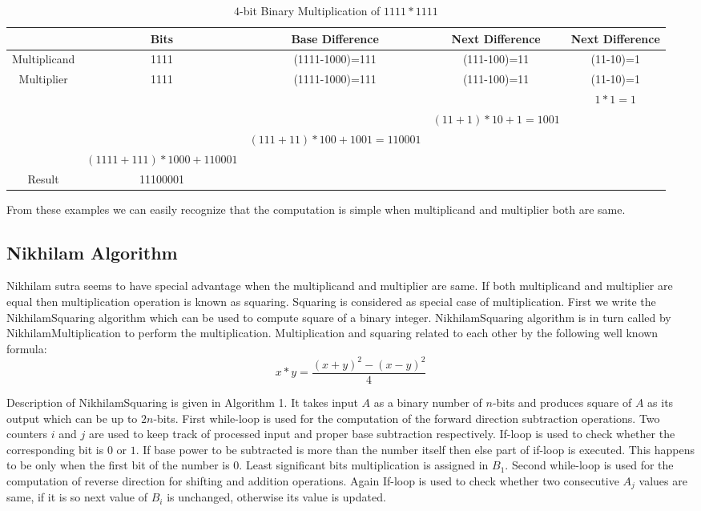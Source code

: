 \documentclass[conference]{IEEEtran}
\begin{document}
\begin{table*}[ht]
\renewcommand{\arraystretch}{1.3}
\caption{$4$-bit Binary Multiplication of $1111*1111$}
\label{table 7}
\begin{center}
\begin{tabular}{|c| c| c| c| c|} 
\hline
 & Bits & Base Difference  & Next Difference & Next Difference  \\ [1ex] \hline\hline 
Multiplicand & 1111 & (1111-1000)=111 &(111-100)=11 & (11-10)=1  \\ \hline
Multiplier & 1111 & (1111-1000)=111 &(111-100)=11 & (11-10)=1  \\ \hline
 &  &  &  & $1*1=1$  \\ \hline
 &  &  & $(11+1)*10+1=1001$ & \\ \hline
 &  & $(111+11)*100 + 1001=110001$ &  & \\ \hline
 & $(1111+111)*1000 + 110001$ &  &  & \\ \hline
Result & 11100001 &  &  &   \\ [1ex] \hline

\end{tabular} 
\end{center}
\end{table*} 


From these examples we can easily recognize that the computation is simple when multiplicand and multiplier both are same. 


\subsection{Nikhilam Algorithm}
 Nikhilam sutra seems to have special advantage when the multiplicand and multiplier are same. If both multiplicand and multiplier are equal then multiplication operation is known as squaring. Squaring is considered as special case of multiplication. First we write the NikhilamSquaring algorithm which can be used to compute square of a binary integer. NikhilamSquaring algorithm is in turn called by NikhilamMultiplication to perform the multiplication. Multiplication and squaring related to each other by the following well known formula: $$x*y=\frac{(x+y)^2 - (x-y)^2}{4} $$

\indent Description of NikhilamSquaring is given in Algorithm 1. It takes input $A$ as a binary number of $n$-bits and produces square of $A$ as its output which can be up to $2n$-bits. First while-loop is used for the computation of the forward direction subtraction operations. Two counters $i$ and $j$ are used to keep track of processed input and proper base subtraction respectively. If-loop is used to check whether the corresponding bit is $0$ or $1$. If base power to be subtracted is more than the number itself then else part of if-loop is executed. This happens to be only when the first bit of the number is $0$. Least significant bits multiplication is assigned in $B_1$. Second while-loop is used for the computation of reverse direction for shifting and addition operations. Again If-loop is used to check whether two consecutive $A_j$ values are same, if it is so next value of $B_i$ is unchanged, otherwise its value is updated.   
\end{document}
